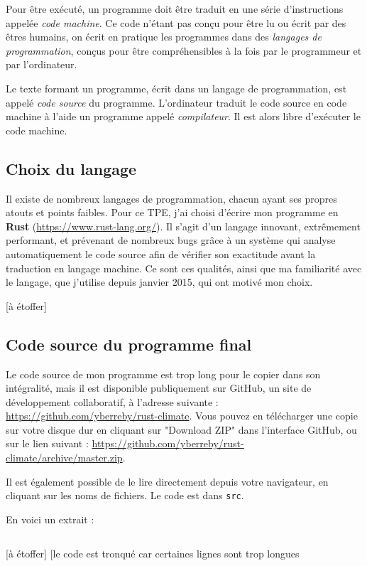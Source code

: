 \documentclass[12pt]{article}
\begin{document}
Pour être exécuté, un programme doit être traduit en une série d'instructions appelée \textit{code machine}. Ce code n'étant pas conçu pour être lu ou écrit par des êtres humains, on écrit en pratique les programmes dans des \textit{langages de programmation}, conçus pour être compréhensibles à la fois par le programmeur et par l'ordinateur.

Le texte formant un programme, écrit dans un langage de programmation, est appelé \textit{code source} du programme. L'ordinateur traduit le code source en code machine à l'aide un programme appelé \textit{compilateur}. Il est alors libre d'exécuter le code machine.

\subsection{Choix du langage}
Il existe de nombreux langages de programmation, chacun ayant ses propres atouts et points faibles. Pour ce TPE, j'ai choisi d'écrire mon programme en \textbf{Rust} (\url{https://www.rust-lang.org/}). Il s'agit d'un langage innovant, extrêmement performant, et prévenant de nombreux bugs grâce à un système qui analyse automatiquement le code source afin de vérifier son exactitude avant la traduction en langage machine. Ce sont ces qualités, ainsi que ma familiarité avec le langage, que j'utilise depuis janvier 2015, qui ont motivé mon choix.

[à étoffer]

\subsection{Code source du programme final}
Le code source de mon programme est trop long pour le copier dans son intégralité, mais il est disponible publiquement sur GitHub, un site de développement collaboratif, à l'adresse suivante : \url{https://github.com/yberreby/rust-climate}. Vous pouvez en télécharger une copie sur votre disque dur en cliquant sur "Download ZIP" dans l'interface GitHub, ou sur le lien suivant : \url{https://github.com/yberreby/rust-climate/archive/master.zip}.

Il est également possible de le lire directement depuis votre navigateur, en cliquant sur les noms de fichiers. Le code est dans \texttt{src}.

En voici un extrait :

\inputminted[linenos]{rust}{temperature.rs}

[à étoffer]
[le code est tronqué car certaines lignes sont trop longues
\end{document}
